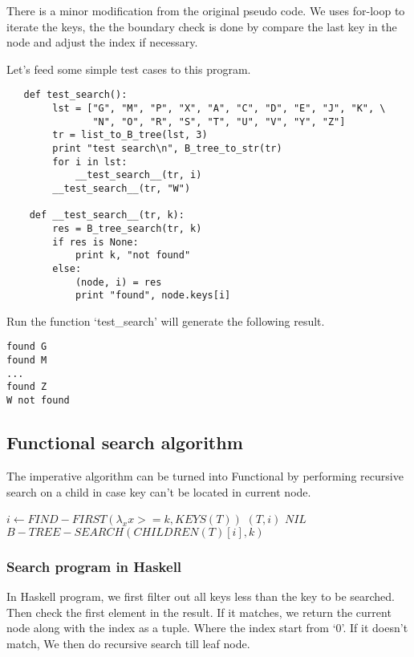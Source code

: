 \documentclass{article}
\begin{document}
There is a minor modification from the original pseudo code.
We uses for-loop to iterate the keys, the the boundary check is done
by compare the last key in the node and adjust the index if
necessary.

Let's feed some simple test cases to this program.

\begin{lstlisting}
   def test_search():
        lst = ["G", "M", "P", "X", "A", "C", "D", "E", "J", "K", \
               "N", "O", "R", "S", "T", "U", "V", "Y", "Z"]
        tr = list_to_B_tree(lst, 3)
        print "test search\n", B_tree_to_str(tr)
        for i in lst:
            __test_search__(tr, i)
        __test_search__(tr, "W")

    def __test_search__(tr, k):
        res = B_tree_search(tr, k)
        if res is None:
            print k, "not found"
        else:
            (node, i) = res
            print "found", node.keys[i]
\end{lstlisting}

Run the function `test\_search' will generate the following result.

\begin{verbatim}
found G
found M
...
found Z
W not found
\end{verbatim}

\subsection{Functional search algorithm}
The imperative algorithm can be turned into Functional by performing
recursive search on a child in case key can't be located in current
node. 

\begin{algorithmic}[1]
  \State $i \gets FIND-FIRST( \lambda_xx>=k, KEYS(T))$
    \State \Return $(T, i)$
  \EndIf
    \State \Return $NIL$ 
  \Else
    \State \Return $B-TREE-SEARCH(CHILDREN(T)[i], k)$
  \EndIf
\EndFunction
\end{algorithmic}

\subsubsection*{Search program in Haskell}
In Haskell program, we first filter out all keys less than the
key to be searched. Then check the first element in the result.
If it matches, we return the current node along with the index
as a tuple. Where the index start from `0'. If it doesn't match,
We then do recursive search till leaf node.
\end{document}
